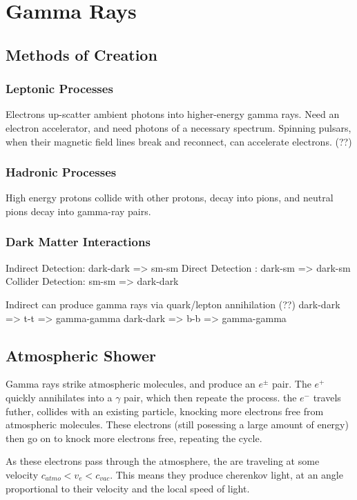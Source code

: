 \cleartooddpage[\thispagestyle{empty}]
\chapter{Gamma Rays}


\section{Methods of Creation}

\subsection{Leptonic Processes}
Electrons up-scatter ambient photons into higher-energy gamma rays.
Need an electron accelerator, and need photons of a necessary spectrum.
Spinning pulsars, when their magnetic field lines break and reconnect, can accelerate electrons. (??)

\subsection{Hadronic Processes}
High energy protons collide with other protons, decay into pions, and neutral pions decay into gamma-ray pairs.


\subsection{Dark Matter Interactions}
Indirect Detection: dark-dark => sm-sm
Direct Detection  : dark-sm => dark-sm
Collider Detection: sm-sm => dark-dark

Indirect can produce gamma rays via quark/lepton annihilation (??)
dark-dark => t-t => gamma-gamma
dark-dark => b-b => gamma-gamma


\section{Atmospheric Shower}

Gamma rays strike atmospheric molecules, and produce an $e^\pm$ pair.
The $e^+$ quickly annihilates into a $\gamma$ pair, which then repeate the process.
the $e^-$ travels futher, collides with an existing particle, knocking more electrons free from atmospheric molecules.
These electrons (still posessing a large amount of energy) then go on to knock more electrons free, repeating the cycle.

As these electrons pass through the atmosphere, the are traveling at some velocity $c_{atmo}<v_e<c_{vac}$.
This means they produce cherenkov light, at an angle proportional to their velocity and the local speed of light.


